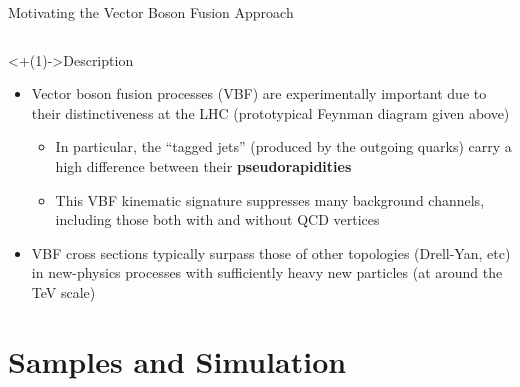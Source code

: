 \documentclass[]{beamer}
\begin{document}
\begin{frame}{Motivating the Vector Boson Fusion Approach}
\begin{columns}
\begin{column}{0.5\linewidth}
{{
                }
            }
        \end{column}
    \end{columns}
    \begin{block}<+(1)->{Description}
        \begin{itemize}[<+(1)->]
            \item Vector boson fusion processes (VBF) are experimentally important due to their distinctiveness at the LHC (prototypical Feynman diagram given above)
            \begin{itemize}[<+(1)->]
                \item In particular, the ``tagged jets'' (produced by the outgoing quarks) carry a high difference between their \textbf{pseudorapidities}
                \item This VBF kinematic signature suppresses many background channels, including those both with and without QCD vertices 
            \end{itemize}
            \item VBF cross sections typically surpass those of other topologies (Drell-Yan, etc) in new-physics processes with sufficiently heavy new particles (at around the TeV scale)
        \end{itemize}
    \end{block}
\end{frame}



%
%
\section{Samples and Simulation}
\end{document}

